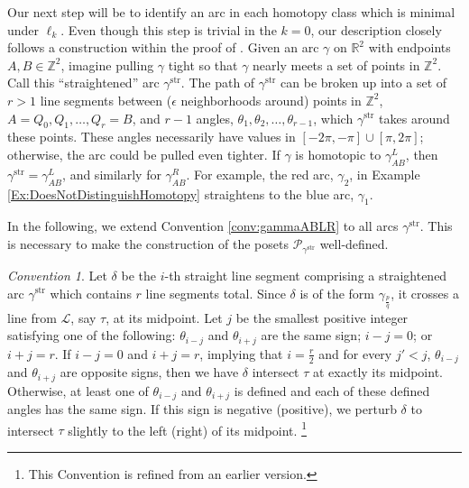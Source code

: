 \documentclass[12pt, letterpaper,table]{amsart}
\theoremstyle{remark}
\newtheorem{convention}[theorem]{Convention}
\newcommand{\fpq}{\frac{p}{q}}
\newcommand{\calP}{\mathcal{P}}
\newcommand{\stir}{\mathrm{str}}
\begin{document}
Our next step will be to identify an arc in each homotopy class which is minimal under $\ell_k$. Even though  this step is trivial in the $k = 0$, our description closely follows a construction within the proof of \cite[Theorem 3.5]{LLRS}. Given an arc $\gamma$ on $\mathbb{R}^2$ with endpoints $A,B \in \mathbb{Z}^2$, imagine pulling $\gamma$ tight so that $\gamma$ nearly meets a set of points in $\mathbb{Z}^2$. Call this ``straightened'' arc $\gamma^{\stir}$. The path of $\gamma^\stir$ can be broken up into a set of $r > 1$ line segments between ($\epsilon$ neighborhoods around) points in $\mathbb{Z}^2$, $A = Q_0, Q_1,\ldots,Q_r = B$, and $r-1$ angles, $\theta_1,\theta_2,\ldots,\theta_{r-1}$, which $\gamma^\stir$ takes around these points. These angles necessarily have values in $[-2\pi,-\pi] \cup [\pi,2\pi]$; otherwise, the arc could be pulled even tighter. If $\gamma$ is homotopic to $\gamma_{AB}^L$, then $\gamma^\stir = \gamma_{AB}^L$, and similarly for $\gamma_{AB}^R$. For example, the red arc, $\gamma_2$, in Example \ref{Ex:DoesNotDistinguishHomotopy} straightens to the blue arc, $\gamma_1$. 

In the following, we extend Convention \ref{conv:gammaABLR} to all arcs $\gamma^\stir$. This is necessary to make the construction of the posets $\calP_{\gamma^\stir}$ well-defined.

\begin{convention}\label{conv:StraightenedArcs}
Let $\delta$ be the $i$-th straight line segment comprising a straightened arc $\gamma^\stir$ which contains $r$ line segments total. Since $\delta$ is of the form $\gamma_\fpq$, it crosses a line from $\mathcal{L}$, say $\tau$, at its midpoint. Let $j$ be the smallest positive integer satisfying one of the following: $\theta_{i-j}$ and $\theta_{i+j}$ are the same sign; $i-j = 0$; or $i+j = r$. If $i-j = 0$ and $i+j = r$, implying that $i = \frac{r}{2}$ and for every $j'<j$, $\theta_{i-j}$ and $\theta_{i+j}$ are opposite signs, then we have $\delta$ intersect $\tau$ at exactly its midpoint. Otherwise, at least one of $\theta_{i-j}$ and $\theta_{i+j}$ is defined and each of these defined angles has the same sign. If this sign is negative (positive), we perturb $\delta$ to intersect $\tau$ slightly to the left (right) of its midpoint. \footnote{This Convention is refined from an earlier version.}
\end{convention}
\end{document}
